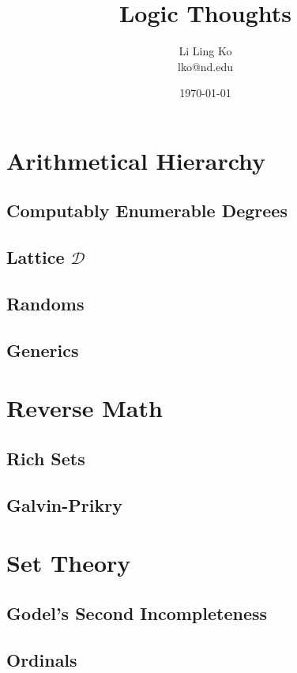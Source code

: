 \documentclass{article}
\begin{document}
\title{Logic Thoughts}
\author{Li Ling Ko\\ lko@nd.edu}
\date{\today}
\maketitle

\section{Arithmetical Hierarchy}
  \subsection{Computably Enumerable Degrees}
    
  \subsection{Lattice $\mathcal{D}$}
    
  \subsection{Randoms}
    
  \subsection{Generics}
    

\section{Reverse Math}
  \subsection{Rich Sets}
    
  \subsection{Galvin-Prikry}
    

\section{Set Theory}
  \subsection{Godel's Second Incompleteness}
    
  \subsection{Ordinals}
    
\end{document}
